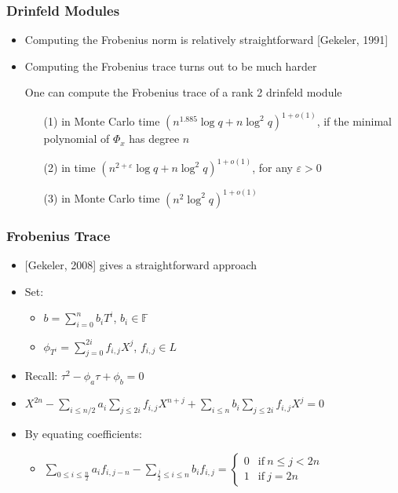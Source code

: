 \documentclass{beamer}
\begin{document}


\begin{frame}
\frametitle{Drinfeld Modules}

\begin{itemize}
\item Computing the Frobenius norm is relatively straightforward [Gekeler, 1991]
\item Computing the Frobenius trace turns out to be much harder

\begin{theorem}
One can compute the Frobenius trace of a rank 2 drinfeld module
\begin{itemize}
\item[(1)] in Monte Carlo time $(n^{1.885} \log q + n \log^2 q)^{1+o(1)}$,
  if the minimal polynomial of $\Phi_x$ has degree $n$
\item[(2)] in time $(n^{2+\varepsilon} \log q + n \log^2 q)^{1+o(1)}$, for
  any $\varepsilon > 0$
\item[(3)] in Monte Carlo time $(n^2 \log^2 q)^{1+o(1)}$
\end{itemize}
\end{theorem}

\end{itemize}


\end{frame}

\begin{frame}
\frametitle{Frobenius Trace}

\begin{itemize}
    \item $[$Gekeler, 2008] gives a straightforward approach
    \item Set:
    \begin{itemize}
        \item $b = \sum_{i=0}^n b_i T^i$, $b_i \in \mathbb{F}$
        \item $\phi_{T^i} = \sum_{j=0}^{2i}f_{i,j} X^j$, $f_{i,j} \in L$
    \end{itemize}
    \item Recall: $\tau^2 - \phi_a\tau + \phi_b = 0$
    \item $X^{2n} - \sum_{i \leq n/2}a_i\sum_{j\leq 2i}f_{i,j} X^{n + j} + \sum_{i\leq n}b_i \sum_{j \leq 2i}f_{i,j} X^j = 0 $
        \item By equating coefficients:
    \begin{itemize}
    \item 
    $\sum_{0 \leq i \leq \frac{n}{2}} a_i f_{i,j-n} - \sum_{\frac{j}{2} \leq i \leq n} b_if_{i,j} =  \begin{cases} 0 & \text{if}\ n \leq j < 2n \\ 1 & \text{if}\ j = 2n   \end{cases}$
    \end{itemize}
\end{itemize}


\end{frame}
\end{document}
